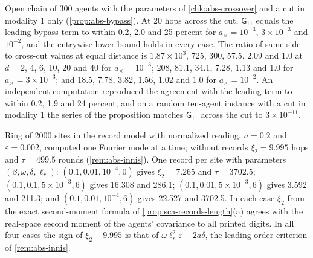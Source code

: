 \begin{numcheck}\label{chk:abs-bypass}
Open chain of 300 agents with the parameters of \cref{chk:abs-crossover} and a cut in modality 1 only (\cref{prop:abs-bypass}). At 20 hops across the cut, $\mathsf G_{11}$ equals the leading bypass term to within 0.2, 2.0 and 25 percent for $a_\times=10^{-3}$, $3\times10^{-3}$ and $10^{-2}$, and the entrywise lower bound holds in every case. The ratio of same-side to cross-cut values at equal distance is $1.87\times10^3$, 725, 300, 57.5, 2.09 and 1.0 at $d=2$, 4, 6, 10, 20 and 40 for $a_\times=10^{-3}$; 208, 81.1, 34.1, 7.28, 1.13 and 1.0 for $a_\times=3\times10^{-3}$; and 18.5, 7.78, 3.82, 1.56, 1.02 and 1.0 for $a_\times=10^{-2}$. An independent computation reproduced the agreement with the leading term to within 0.2, 1.9 and 24 percent, and on a random ten-agent instance with a cut in modality 1 the series of the proposition matches $\mathsf G_{11}$ across the cut to $3\times10^{-11}$.
\end{numcheck}

\begin{numcheck}\label{chk:abs-media}
Ring of 2000 sites in the record model with normalized reading, $a=0.2$ and $\varepsilon=0.002$, computed one Fourier mode at a time; without records $\xi_2=9.995$ hops and $\tau=499.5$ rounds (\cref{rem:abs-innis}). One record per site with parameters $(\beta,\omega,\delta,\ell_r)$: $(0.1,0.01,10^{-4},0)$ gives $\xi_2=7.265$ and $\tau=3702.5$; $(0.1,0.1,5\times10^{-3},6)$ gives 16.308 and 286.1; $(0.1,0.01,5\times10^{-3},6)$ gives 3.592 and 211.3; and $(0.1,0.01,10^{-4},6)$ gives 22.527 and 3702.5. In each case $\xi_2$ from the exact second-moment formula of \cref{prop:sca-records-length}(a) agrees with the real-space second moment of the agents' covariance to all printed digits. In all four cases the sign of $\xi_2-9.995$ is that of $\omega\ell_r^2\varepsilon-2a\delta$, the leading-order criterion of \cref{rem:abs-innis}.
\end{numcheck}

